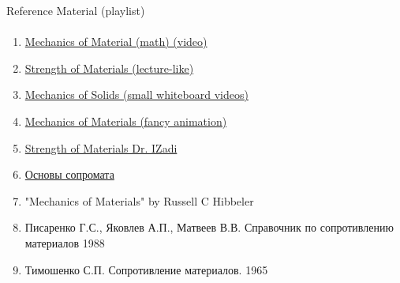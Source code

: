 \documentclass[aspectratio=169]{beamer}
\newcommand{\fbckg}[1]{\usebackgroundtemplate{\texttt{[image: \#1]}}}%
\begin{document}
\begin{frame}[t]{Reference Material (playlist)}
    \framesubtitle{}
    \begin{enumerate}
        \item \href{https://www.youtube.com/playlist?list=PLOBajja3EcWJx9MVpbBvLthzmZbq4Kwlm}{Mechanics of Material (math) (video)}
        \item \href{https://www.youtube.com/playlist?list=PL9RcWoqXmzaLlfmNg2Ku1SdZtvXnYrLbc}{Strength of Materials (lecture-like)}
        \item \href{https://www.youtube.com/playlist?list=PLRqDfxcafc21wlI3E56IkDmRJ-33apMjv}{Mechanics of Solids (small whiteboard videos)}
        \item \href{https://www.youtube.com/playlist?list=PLEYqyyrm-hQ3wtF34smyJSAOqUJqnf1ch}{Mechanics of Materials (fancy animation)}
        \item \href{https://www.youtube.com/playlist?list=PLZOZfX_TaWAEg1XjZ1fkUxT0XMB_Nq7hV}{Strength of Materials Dr. IZadi}
        \item \href{https://www.youtube.com/playlist?list=PLFOi9-wTdZsP1SdgG2qok-2gOyhgKilX7}{Основы сопромата}
        \item "Mechanics of Materials" by Russell C Hibbeler
        \item Писаренко Г.С., Яковлев А.П., Матвеев В.В. Справочник по сопротивлению материалов 1988
        \item Тимошенко С.П. Сопротивление материалов. 1965
    \end{enumerate}
    \end{frame}

\fbckg{fibeamer/figs/last_page.png}
\frame[plain]{}
\end{document}
